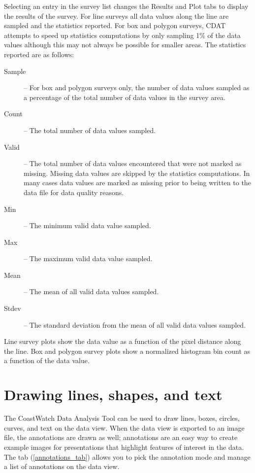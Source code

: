 Selecting an entry in the survey list changes the {\gui Results}
and {\gui Plot} tabs to display the results of the survey.  For
line surveys all data values along the line are sampled and the
statistics reported.  For box and polygon surveys, CDAT attempts
to speed up statistics computations by only sampling 1\% of the
data values although this may not always be possible for smaller
areas.  The statistics reported are as follows:
\begin{description}

\item[{\gui Sample}] -- For box and polygon surveys only, the
number of data values sampled as a percentage of the total number
of data values in the survey area.

\item[{\gui Count}] -- The total number of data values sampled.

\item[{\gui Valid}] -- The total number of data values encountered
that were not marked as missing.  Missing data values are skipped
by the statistics computations.  In many cases data values are
marked as missing prior to being written to the data file for
data quality reasons.

\item[{\gui Min}] -- The minimum valid data value sampled.

\item[{\gui Max}] -- The maximum valid data value sampled.

\item[{\gui Mean}] -- The mean of all valid data values sampled.

\item[{\gui Stdev}] -- The standard deviation from the mean of all
valid data values sampled.

\end{description}
Line survey plots show the data value as a function of the pixel
distance along the line.  Box and polygon survey plots show a
normalized histogram bin count as a function of the data value.

\section{Drawing lines, shapes, and text}

The CoastWatch Data Analysis Tool can be used to draw lines,
boxes, circles, curves, and text on the data view.  When the data
view is exported to an image file, the annotations are drawn as
well; annotations are an easy way to create example images for
presentations that highlight features of interest in the data.
The  tab
(\autoref{annotations_tab}) allows you to pick the annotation
mode and manage a list of annotations on the data view.

